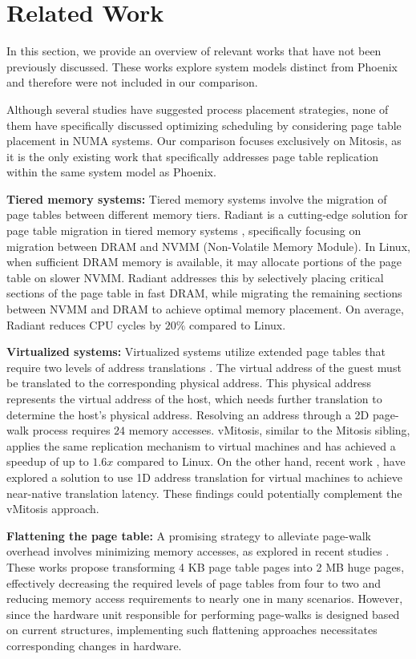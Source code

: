 \section{Related Work}
\label{section:related-works}
In this section, we provide an overview of relevant works that have not been previously discussed. These works explore system models distinct from Phoenix and therefore were not included in our comparison.

Although several studies have suggested process placement strategies, none of them have specifically discussed optimizing scheduling by considering page table placement in NUMA systems. Our comparison focuses exclusively on Mitosis, as it is the only existing work that specifically addresses page table replication within the same system model as Phoenix.

\textbf{Tiered memory systems:} Tiered memory systems involve the migration of page tables between different memory tiers. Radiant is a cutting-edge solution for page table migration in tiered memory systems \cite{radiant}, specifically focusing on migration between DRAM and NVMM (Non-Volatile Memory Module). In Linux, when sufficient DRAM memory is available, it may allocate portions of the page table on slower NVMM. Radiant addresses this by selectively placing critical sections of the page table in fast DRAM, while migrating the remaining sections between NVMM and DRAM to achieve optimal memory placement. On average, Radiant reduces CPU cycles by $20\%$ compared to Linux.

\textbf{Virtualized systems:}
Virtualized systems utilize extended page tables that require two levels of address translations \cite{vmitosis}. The virtual address of the guest must be translated to the corresponding physical address. This physical address represents the virtual address of the host, which needs further translation to determine the host's physical address. Resolving an address through a 2D page-walk process requires $24$ memory accesses. vMitosis, similar to the Mitosis sibling, applies the same replication mechanism to virtual machines and has achieved a speedup of up to $1.6x$ compared to Linux. On the other hand, recent work \cite{translation-pass-through}, have explored a solution to use 1D address translation for virtual machines to achieve near-native translation latency. These findings could potentially complement the vMitosis approach.

\textbf{Flattening the page table:}
A promising strategy to alleviate page-walk overhead involves minimizing memory accesses, as explored in recent studies \cite{every-walk-is-a-hit, compendia}. These works propose transforming 4 KB page table pages into 2 MB huge pages, effectively decreasing the required levels of page tables from four to two and reducing memory access requirements to nearly one in many scenarios. However, since the hardware unit responsible for performing page-walks is designed based on current structures, implementing such flattening approaches necessitates corresponding changes in hardware.

